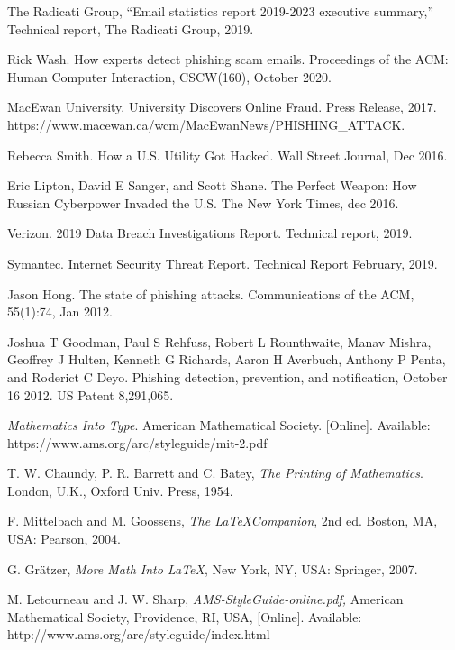 \documentclass[lettersize,journal]{IEEEtran}
\begin{document}
\begin{thebibliography}{1}
  

  The Radicati Group, ``Email statistics report 2019-2023 executive summary,'' Technical report, The Radicati Group, 2019.

  Rick Wash. How experts detect phishing scam emails. Proceedings of the ACM: Human Computer Interaction, CSCW(160), October 2020.

  MacEwan University. University Discovers Online Fraud. Press Release, 2017. https://www.macewan.ca/wcm/MacEwanNews/PHISHING\_ATTACK.

  Rebecca Smith. How a U.S. Utility Got Hacked. Wall Street Journal, Dec 2016.

  Eric Lipton, David E Sanger, and Scott Shane. The Perfect Weapon: How Russian Cyberpower Invaded the U.S. The New York Times, dec 2016.

  Verizon. 2019 Data Breach Investigations Report. Technical report, 2019.

  Symantec. Internet Security Threat Report. Technical Report February, 2019.

  Jason Hong. The state of phishing attacks. Communications of the ACM, 55(1):74, Jan 2012.

  Joshua T Goodman, Paul S Rehfuss, Robert L Rounthwaite, Manav Mishra, Geoffrey J Hulten, Kenneth G Richards, Aaron H Averbuch, Anthony P Penta, and Roderict C Deyo. Phishing detection, prevention, and notification, October 16 2012. US Patent 8,291,065.

  {\it{Mathematics Into Type}}. American Mathematical Society. [Online]. Available: https://www.ams.org/arc/styleguide/mit-2.pdf

  T. W. Chaundy, P. R. Barrett and C. Batey, {\it{The Printing of Mathematics}}. London, U.K., Oxford Univ. Press, 1954.

  F. Mittelbach and M. Goossens, {\it{The \LaTeX Companion}}, 2nd ed. Boston, MA, USA: Pearson, 2004.

  G. Gr\"atzer, {\it{More Math Into LaTeX}}, New York, NY, USA: Springer, 2007.

  M. Letourneau and J. W. Sharp, {\it{AMS-StyleGuide-online.pdf,}} American Mathematical Society, Providence, RI, USA, [Online]. Available: http://www.ams.org/arc/styleguide/index.html


\end{thebibliography}
\end{document}
